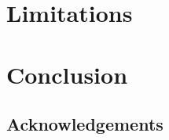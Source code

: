 \documentclass[acmlarge,review,anonymous]{acmart}\settopmatter{printfolios=true}
\begin{document}

\section{Limitations}
\label{sect.limitations}





\section{Conclusion}
\label{sect.conclusion}

\subsection*{Acknowledgements}

{}
\end{document}
